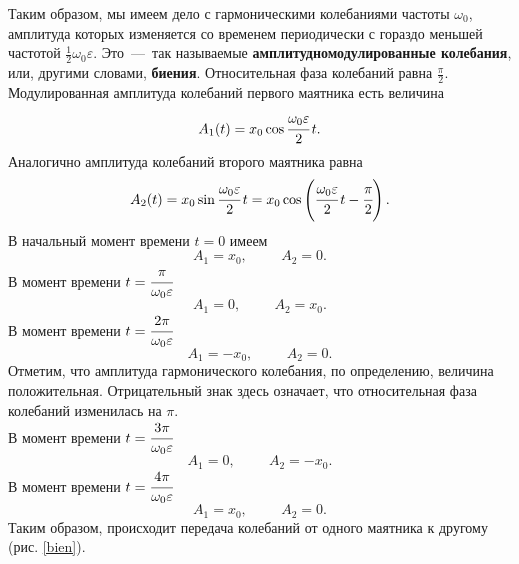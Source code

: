 \documentclass[a4paper,12pt]{article}
\theoremstyle{plain} %
\theoremstyle{definition} %
\theoremstyle{remark} %
\begin{document}
Таким образом, мы имеем дело с гармоническими колебаниями частоты $\omega_0$, амплитуда которых изменяется со временем периодически с гораздо меньшей частотой $\frac{1}{2}\omega_0\varepsilon$. Это~---~так называемые \textbf{амплитудномодулированные колебания}, или, другими словами, \textbf{биения}. Относительная фаза колебаний равна $\frac{\pi}{2}$. Модулированная амплитуда колебаний
первого маятника есть величина
\begin{equation}
A_1(t)=x_0\cos\cfrac{\omega_0\varepsilon}{2}\,t.
\label{28}
\end{equation}
Аналогично амплитуда колебаний второго маятника равна
\begin{equation}
A_2(t)=x_0\sin\cfrac{\omega_0\varepsilon}{2}\,t=x_0\cos\left(\cfrac{\omega_0\varepsilon}{2}\,t-\cfrac{\pi}{2}\right).
\label{29}
\end{equation}
В начальный момент времени $t=0$ имеем
$$A_1=x_0, \hspace{1cm} A_2=0.$$
В момент времени $t=\cfrac{\pi}{\omega_0\varepsilon}$
$$A_1=0, \hspace{1cm} A_2=x_0.$$
В момент времени $t=\cfrac{2\pi}{\omega_0\varepsilon}$
$$A_1=-x_0, \hspace{1cm} A_2=0.$$
Отметим, что амплитуда гармонического колебания, по определению,
величина положительная. Отрицательный знак здесь означает, что относительная фаза колебаний изменилась на $\pi$.\\ В момент времени $t=\cfrac{3\pi}{\omega_0\varepsilon}$
$$A_1=0, \hspace{1cm} A_2=-x_0.$$
В момент времени $t=\cfrac{4\pi}{\omega_0\varepsilon}$
$$A_1=x_0, \hspace{1cm} A_2=0.$$
Таким образом, происходит передача колебаний от одного маятника к другому (рис. \ref{bien}). 
\end{document}
